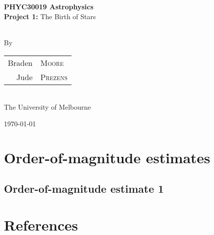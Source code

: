 \documentclass[a4paper]{article} %
\begin{document}
\pagestyle{empty}

\newcommand{\HRule}{\rule{\linewidth}{0.5mm}}

\begin{titlepage}

    \begin{center}
        \textsc{}\\[3cm]

        \\[0.75cm]        
        \Huge \textbf{PHYC30019 Astrophysics}\\[0.5cm]
        \huge \textbf{Project 1:} The Birth of Stars\\[0.5cm] 
        \\[1.5cm]

        \begin{minipage}{0.5\textwidth}
        \begin{center}

		\vspace{3cm}
        \large By \\[0.75cm]
        \begin{tabular}{rl}
        \Large Braden &\Large \textsc{Moore} \\[0.1cm]
        \Large Jude & \Large \textsc{Prezens} \\    
		\end{tabular}  
		\\[1cm]
        \normalsize \normalfont 
        The University of Melbourne \\[2cm]

        \end{center}
        \end{minipage}

        \vfill

        \large \today
    \end{center}

\newpage
\end{titlepage}
\begin{comment}
\pagestyle{fancy}
\pagenumbering{gobble}
\tableofcontents
\newpage
\end{comment}

\pagestyle{fancy}
\setcounter{page}{1}
\section{Order-of-magnitude estimates}
\subsection{Order-of-magnitude estimate 1}


\pagebreak

\section{References}



\end{document}
